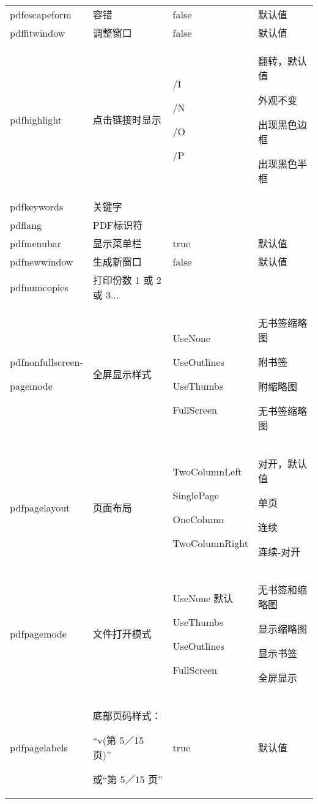 \begin{center}
\begin{longtable}[H]{p{3.2cm}p{3cm}p{3cm}p{3cm}}
pdfescapeform &容错&false &默认值\\


pdffitwindow &调整窗口&false &默认值\\
pdfhighlight &点击链接时显示
&
/I \par
/N \par
/O \par
/P
&
翻转，默认值 \par
外观不变 \par
出现黑色边框 \par
出现黑色半框\\

pdfkeywords &关键字&&\\
pdflang &PDF标识符&&\\
pdfmenubar &显示菜单栏&true &默认值\\
pdfnewwindow &生成新窗口&false &默认值\\
pdfnumcopies &打印份数 1 或 2 或 3...&&\\

pdfnonfullscreen-\par
pagemode
&
全屏显示样式
&
UseNone \par
UseOutlines \par
UseThumbs \par
FullScreen
&
无书签缩略图 \par
附书签 \par
附缩略图 \par
无书签缩略图
\\
pdfpagelayout
&
页面布局
&
TwoColumnLeft \par
SinglePage \par
OneColumn \par
TwoColumnRight
&
对开，默认值 \par
单页 \par
连续 \par
连续-对开
\\
pdfpagemode &
文件打开模式
&
UseNone 默认\par
UseThumbs\par
UseOutlines\par
FullScreen
&
无书签和缩略图\par
显示缩略图\par
显示书签\par
全屏显示
\\
pdfpagelabels &
底部页码样式：\par
“v(第 5／15 页)”\par
或“第 5／15 页”
&true& 默认值\\


\end{longtable}
\end{center}
